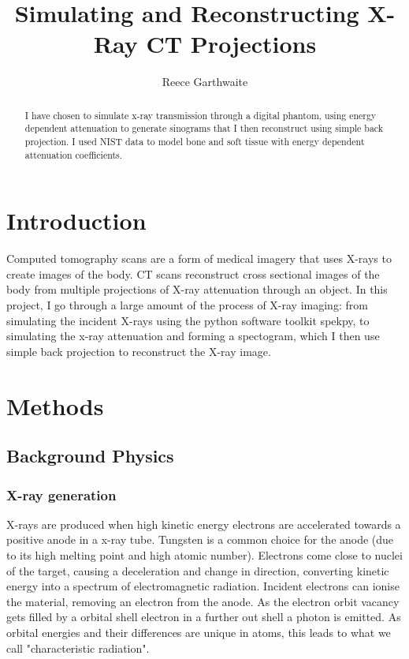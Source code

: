 \documentclass{article}
\title{Simulating and Reconstructing X-Ray CT Projections}
\author{Reece Garthwaite}
\date{}
\begin{document}
\maketitle

\begin{abstract}
I have chosen to simulate x-ray transmission through a digital phantom, using energy dependent attenuation to generate sinograms that I then reconstruct using simple back projection. I used NIST data to model bone and soft tissue with energy dependent attenuation coefficients.
\end{abstract}

\section{Introduction}
Computed tomography scans are a form of medical imagery that uses X-rays to  create images of the body. CT scans reconstruct cross sectional images of the body from multiple projections of X-ray attenuation through an object. In this project, I go through a large amount of the process of X-ray imaging: from simulating the incident X-rays using the python software toolkit spekpy, to simulating the x-ray attenuation and forming a spectogram, which I then use simple back projection to reconstruct the X-ray image.

\section{Methods}

\subsection{Background Physics}
\subsubsection{X-ray generation}
X-rays are produced when high kinetic energy electrons are accelerated towards a positive anode in a x-ray tube. Tungsten is a common choice for the anode (due to its high melting point and high atomic number). Electrons come close to nuclei of the target, causing a deceleration and change in direction, converting kinetic energy into a spectrum of electromagnetic radiation. Incident electrons can ionise the material, removing an electron from the anode. As the electron orbit vacancy gets filled by a orbital shell electron in a further out shell a photon is emitted. As orbital energies and their differences are unique in atoms, this leads to what we call "characteristic radiation".
\cite{Tafti}
\end{document}
